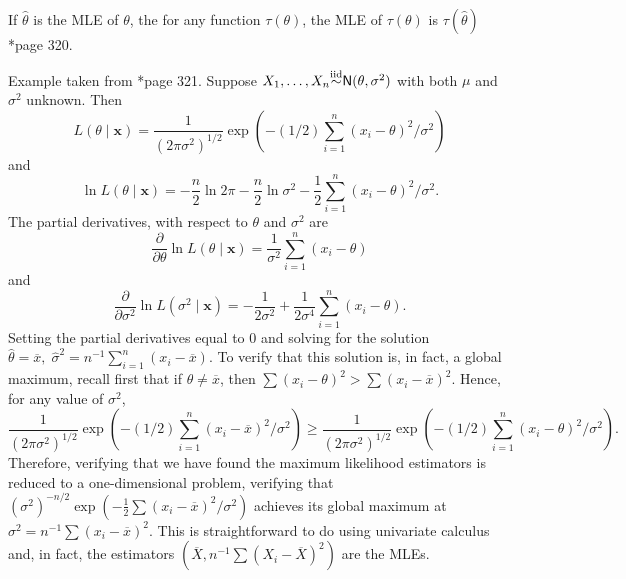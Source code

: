 \begin{thm} \label{thm: invariance_of_mles}
    If $\hat{\theta}$ is the MLE of $\theta$, the for any function $\tau (\theta)$, the MLE of $\tau (\theta)$ is $\tau (\hat{\theta})$ \cite{CasellaGeorge2001SI}*{page 320}.
\end{thm}

\begin{exam} \label{exam: normal_mle_mu_sigma}
    Example taken from \cite{CasellaGeorge2001SI}*{page 321}. Suppose $X_1, \ldots , X_n {\overset{\text{iid}}{\sim}} {\sf N} (\theta , \sigma^2)$ with both $\mu$ and $\sigma^2$ unknown. Then
    \begin{equation*}
        L(\theta \mid \bm{x}) = \frac{1}{(2 \pi \sigma^2)^{1/2}} \exp \left( -(1/2) \sum_{i=1}^{n} (x_i - \theta)^2 / \sigma^2 \right)
    \end{equation*}
    and
    \begin{equation*}
        \ln L(\theta \mid \bm{x}) = -\frac{n}{2} \ln 2 \pi - \frac{n}{2} \ln \sigma^2 - \frac{1}{2} \sum_{i=1}^{n} (x_i - \theta)^2 / \sigma^2 .
    \end{equation*}
    The partial derivatives, with respect to $\theta$ and $\sigma^2$ are
    \begin{equation*}
        \frac{\partial}{\partial \theta} \ln L(\theta \mid \bm{x}) = \frac{1}{\sigma^2} \sum_{i=1}^{n} (x_i - \theta)
    \end{equation*}
    and
    \begin{equation*}
        \frac{\partial}{\partial \sigma^2} \ln L(\sigma^2 \mid \bm{x}) = - \frac{1}{2\sigma^2} + \frac{1}{2 \sigma^4} \sum_{i=1}^{n} (x_i - \theta).
    \end{equation*}
    Setting the partial derivatives equal to $0$ and solving for the solution $\hat{\theta} = \overline{x}, \; \hat{\sigma}^2 = n^{-1} \sum_{i=1}^{n} (x_i - \overline{x})$. To verify that this solution is, in fact, a global maximum, recall first that if $\theta \neq \overline{x}$, then $\sum (x_i - \theta)^2 > \sum (x_i - \overline{x})^2$. Hence, for any value of $\sigma^2$,
    \begin{equation*}
        \frac{1}{(2 \pi \sigma^2)^{1/2}} \exp \left( -(1/2) \sum_{i=1}^{n} (x_i - \overline{x})^2 / \sigma^2 \right) \geq \frac{1}{(2 \pi \sigma^2)^{1/2}} \exp \left( -(1/2) \sum_{i=1}^{n} (x_i - \theta)^2 / \sigma^2 \right) .
    \end{equation*}
    Therefore, verifying that we have found the maximum likelihood estimators is reduced to a one-dimensional problem, verifying that $(\sigma^2)^{-n/2} \exp \left( -\frac{1}{2} \sum (x_i - \overline{x})^2 / \sigma^2 \right)$ achieves its global maximum at $\sigma^2 = n^{-1} \sum (x_i - \overline{x})^2$. This is straightforward to do using univariate calculus and, in fact, the estimators $\left( \overline{X} , n^{-1} \sum \left( X_i - \overline{X} \right)^2 \right)$ are the MLEs.
\end{exam}